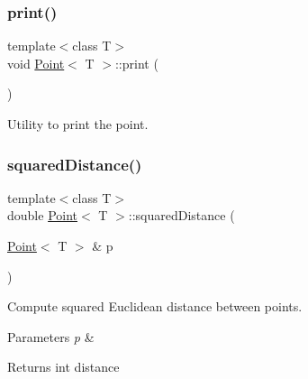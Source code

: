 \subsubsection{\texorpdfstring{print()}{print()}}
{\footnotesize\ttfamily template$<$class T$>$ \\
void \mbox{\hyperlink{classPoint}{Point}}$<$ T $>$\+::print (\begin{DoxyParamCaption}{ }\end{DoxyParamCaption})\hspace{0.3cm}{\ttfamily [inline]}}



Utility to print the point. 


\begin{DoxyCode}{0}

\end{DoxyCode}
\mbox{\label{classPoint_a42457398f330b900143532892ea1d0f5}} 
\subsubsection{\texorpdfstring{squared\+Distance()}{squaredDistance()}}
{\footnotesize\ttfamily template$<$class T$>$ \\
double \mbox{\hyperlink{classPoint}{Point}}$<$ T $>$\+::squared\+Distance (\begin{DoxyParamCaption}\item[{\mbox{\hyperlink{classPoint}{Point}}$<$ T $>$ \&}]{p }\end{DoxyParamCaption})\hspace{0.3cm}{\ttfamily [inline]}}



Compute squared Euclidean distance between points. 


\begin{DoxyParams}{Parameters}
{\em p} & \\
\hline
\end{DoxyParams}
\begin{DoxyReturn}{Returns}
int distance 
\end{DoxyReturn}

